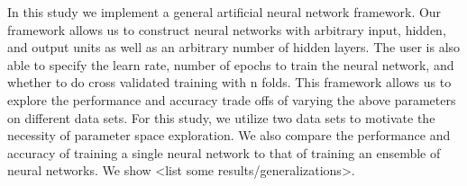 In this study we implement a general artificial neural network framework.
Our framework allows us to construct neural networks with arbitrary input, hidden, and output units as well as an arbitrary number of hidden layers.
The user is also able to specify the learn rate, number of epochs to train the neural network, and whether to do cross validated training with n folds.
This framework allows us to explore the performance and accuracy trade offs of varying the above parameters on different data sets.
For this study, we utilize two data sets to motivate the necessity of parameter space exploration.
We also compare the performance and accuracy of training a single neural network to that of training an ensemble of neural networks.
We show <list some results/generalizations>.
